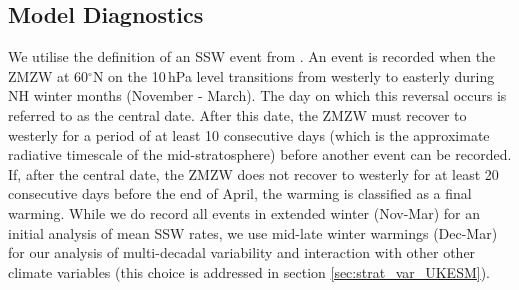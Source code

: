 \subsection{Model Diagnostics}
\label{sec:model_diagnostics}
We utilise the definition of an SSW event from \cite{Butler2015}. An event is recorded when the ZMZW at 60$^\circ$N on the 10\,hPa level transitions from westerly to easterly during NH winter months (November - March). The day on which this reversal occurs is referred to as the central date. After this date, the ZMZW must recover to westerly for a period of at least 10 consecutive days (which is the approximate radiative timescale of the mid-stratosphere) before another event can be recorded.  If, after the central date, the ZMZW does not recover to westerly for at least 20 consecutive days before the end of April, the warming is classified as a final warming. While we do record all events in extended winter (Nov-Mar) for an initial analysis of mean SSW rates, we use mid-late winter warmings (Dec-Mar) for our analysis of multi-decadal variability and interaction with other other climate variables (this choice is addressed in section \ref{sec:strat_var_UKESM}). 

